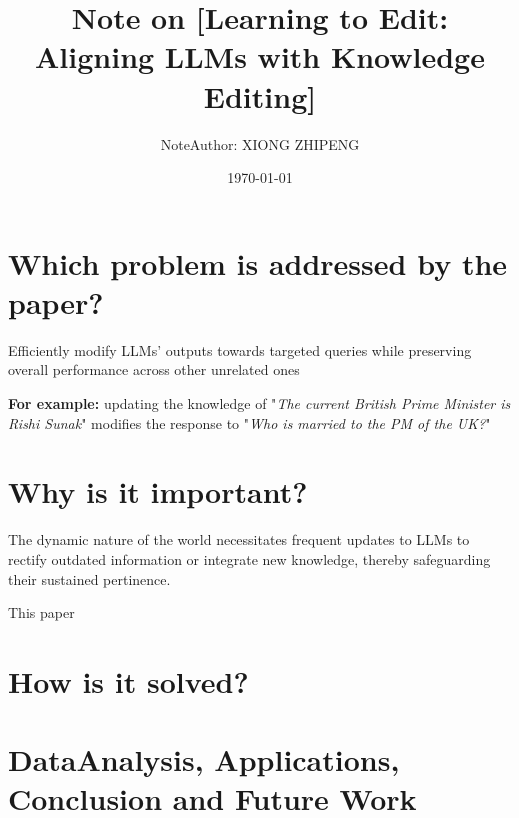\documentclass{article}
\title{Note on [Learning to Edit: Aligning LLMs with Knowledge Editing]}
\author{NoteAuthor: XIONG ZHIPENG}
\date{\today}
\begin{document}
\maketitle

\section{Which problem is addressed by the paper?}
Efficiently modify LLMs' outputs towards targeted queries while preserving overall performance across other unrelated ones

\textbf{For example:}
updating the knowledge of "\textit{The current British Prime Minister is Rishi Sunak}" 
modifies the response to "\textit{Who is married to the PM of the UK?}" 



\section{Why is it important?}

The dynamic nature of the world  necessitates frequent updates to LLMs to rectify outdated information 
or integrate new knowledge, thereby safeguarding their sustained pertinence.

This paper 

\section{How is it solved?}

\section{DataAnalysis, Applications, Conclusion and Future Work}
\end{document}
